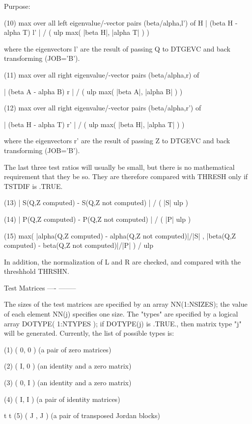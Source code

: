 \begin{DoxyParagraph}{Purpose\+: }
\begin{DoxyVerb}
 (10)  max over all left eigenvalue/-vector pairs (beta/alpha,l') of
                           H
       | (beta H - alpha T) l' | / ( ulp max( |beta H|, |alpha T| ) )

       where the eigenvectors l' are the result of passing Q to
       DTGEVC and back transforming (JOB='B').

 (11)  max over all right eigenvalue/-vector pairs (beta/alpha,r) of

       | (beta A - alpha B) r | / ( ulp max( |beta A|, |alpha B| ) )

 (12)  max over all right eigenvalue/-vector pairs (beta/alpha,r') of

       | (beta H - alpha T) r' | / ( ulp max( |beta H|, |alpha T| ) )

       where the eigenvectors r' are the result of passing Z to
       DTGEVC and back transforming (JOB='B').

 The last three test ratios will usually be small, but there is no
 mathematical requirement that they be so.  They are therefore
 compared with THRESH only if TSTDIF is .TRUE.

 (13)  | S(Q,Z computed) - S(Q,Z not computed) | / ( |S| ulp )

 (14)  | P(Q,Z computed) - P(Q,Z not computed) | / ( |P| ulp )

 (15)  max( |alpha(Q,Z computed) - alpha(Q,Z not computed)|/|S| ,
            |beta(Q,Z computed) - beta(Q,Z not computed)|/|P| ) / ulp

 In addition, the normalization of L and R are checked, and compared
 with the threshhold THRSHN.

 Test Matrices
 ---- --------

 The sizes of the test matrices are specified by an array
 NN(1:NSIZES); the value of each element NN(j) specifies one size.
 The "types" are specified by a logical array DOTYPE( 1:NTYPES ); if
 DOTYPE(j) is .TRUE., then matrix type "j" will be generated.
 Currently, the list of possible types is:

 (1)  ( 0, 0 )         (a pair of zero matrices)

 (2)  ( I, 0 )         (an identity and a zero matrix)

 (3)  ( 0, I )         (an identity and a zero matrix)

 (4)  ( I, I )         (a pair of identity matrices)

         t   t
 (5)  ( J , J  )       (a pair of transposed Jordan blocks)


\end{DoxyVerb}
\end{DoxyParagraph}

